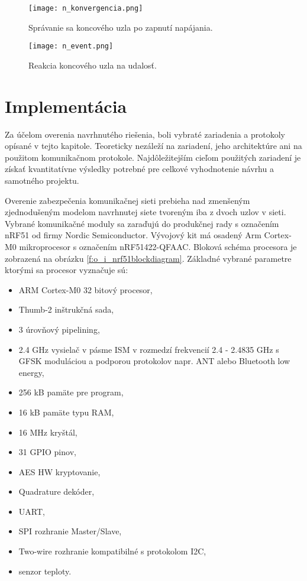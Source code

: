 \documentclass[12pt,a4paper,oneside,openright]{report}
\begin{document}
\begin{figure*}[h]
	\centering
	\texttt{[image: n\_konvergencia.png]}
	\caption{Správanie sa koncového uzla po zapnutí napájania.}
	\label{f:o_konvergencia}
\end{figure*}

\begin{figure*}[h]
	\centering
	\texttt{[image: n\_event.png]}
	\caption{Reakcia koncového uzla na udalosť.}
	\label{f:o_event}
\end{figure*}



\chapter{Implementácia} \label{s_implementation}
Za účelom overenia navrhnutého riešenia, boli vybraté zariadenia a protokoly opísané v tejto kapitole. Teoreticky nezáleží na zariadení, jeho architektúre ani na použitom komunikačnom protokole. Najdôležitejším cieľom použitých zariadení je získať kvantitatívne výsledky potrebné pre celkové vyhodnotenie návrhu a samotného projektu.

Overenie zabezpečenia komunikačnej sieti prebieha nad zmenšeným zjednodušeným modelom navrhnutej siete tvoreným iba z dvoch uzlov v sieti. Vybrané komunikačné moduly sa zaraďujú do produkčnej rady s označením nRF51 od firmy Nordic Semiconductor. Vývojový kit má osadený Arm Cortex-M0 mikroprocesor s označením nRF51422-QFAAC. Bloková schéma procesora je zobrazená na obrázku \ref{f:o_i_nrf51blockdiagram}. Základné vybrané parametre ktorými sa procesor vyznačuje sú\cite{nRF51}:
\begin{itemize}
	\item ARM Cortex-M0 32 bitový procesor,
	\item Thumb-2 inštrukčná sada,
	\item 3 úrovňový pipelining,
	\item 2.4 GHz vysielač v pásme ISM v rozmedzí frekvencií 2.4 - 2.4835 GHz s GFSK moduláciou a podporou protokolov napr. ANT alebo Bluetooth low energy,
	\item 256 kB pamäte pre program,
	\item 16 kB pamäte typu RAM,
	\item 16 MHz kryštál,
	\item 31 GPIO pinov,
	\item AES HW kryptovanie,
	\item Quadrature dekóder,
	\item UART,
	\item SPI rozhranie Master/Slave,
	\item Two-wire rozhranie kompatibilné s protokolom I2C,
	\item senzor teploty.
\end{itemize}
\onehalfspacing
\end{document}
